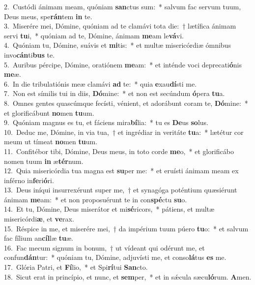 {2.~}Custódi ánimam meam, quóniam \textbf{san}ctus sum:~* salvum fac servum tuum, Deus meus, spe\textbf{rán}tem \textbf{in} te.\\
{3.~}Miserére mei, Dómine, quóniam ad te clamávi tota die:~† lætífica ánimam servi \textbf{tu}i,~* quóniam ad te, Dómine, ánimam \textbf{me}am le\textbf{vá}vi.\\
{4.~}Quóniam tu, Dómine, suávis et \textbf{mi}tis:~* et multæ misericórdiæ ómnibus invo\textbf{cán}ti\textbf{bus} te.\\
{5.~}Auribus pércipe, Dómine, oratiónem \textbf{me}am:~* et inténde voci deprecati\textbf{ó}nis \textbf{me}æ.\\
{6.~}In die tribulatiónis meæ clamávi \textbf{ad} te:~* quia \textbf{e}xau\textbf{dí}sti me.\\
{7.~}Non est símilis tui in diis, \textbf{Dó}mine:~* et non est secúndum \textbf{ó}pera \textbf{tu}a.\\
{8.~}Omnes gentes quascúmque fecísti, vénient, et adorábunt coram te, \textbf{Dó}mine:~* et glorificábunt \textbf{no}men \textbf{tu}um.\\
{9.~}Quóniam magnus es tu, et fáciens mira\textbf{bí}lia:~* tu es \textbf{De}us \textbf{so}lus.\\
{10.~}Deduc me, Dómine, in via tua,~† et ingrédiar in veritáte \textbf{tu}a:~* lætétur cor meum ut tímeat \textbf{no}men \textbf{tu}um.\\
{11.~}Confitébor tibi, Dómine, Deus meus, in toto corde \textbf{me}o,~* et glorificábo nomen tuum \textbf{in} æ\textbf{tér}num.\\
{12.~}Quia misericórdia tua magna est \textbf{su}per me:~* et eruísti ánimam meam ex inférno in\textbf{fe}ri\textbf{ó}ri.\\
{13.~}Deus iníqui insurrexérunt super me,~† et synagóga poténtium quæsiérunt ánimam \textbf{me}am:~* et non proposuérunt te in con\textbf{spé}ctu \textbf{su}o.\\
{14.~}Et tu, Dómine, Deus miserátor et mi\textbf{sé}ricors,~* pátiens, et multæ misericórdi\textbf{æ}, et \textbf{ve}rax.\\
{15.~}Réspice in me, et miserére mei,~† da impérium tuum púero \textbf{tu}o:~* et salvum fac fílium an\textbf{cíl}læ \textbf{tu}æ.\\
{16.~}Fac mecum signum in bonum,~† ut vídeant qui odérunt me, et confun\textbf{dán}tur:~* quóniam tu, Dómine, adjuvísti me, et conso\textbf{lá}tus \textbf{es} me.\\
{17.~}Glória Patri, et \textbf{Fí}lio,~* et Spi\textbf{rí}tui \textbf{San}cto.\\
{18.~}Sicut erat in princípio, et nunc, et \textbf{sem}per,~* et in sǽcula sæcu\textbf{ló}rum. \textbf{A}men.\\
